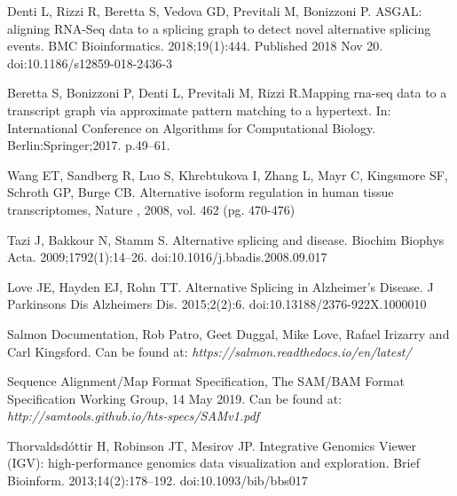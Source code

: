 \documentclass[a4paper,12pt]{article}
\begin{document}
   \newpage

    \tableofcontents
    \newpage
    
    \setlength{\parskip}{0.5em}

    	
    	
    	
    	
    	  
    	
    	
    	
    	
    	
    	
    	
    	
		
		
		\begin{thebibliography}{9}

			Denti L, Rizzi R, Beretta S, Vedova GD, Previtali M, Bonizzoni P. ASGAL: aligning RNA-Seq data to a splicing graph to detect novel alternative splicing events. BMC Bioinformatics. 2018;19(1):444. Published 2018 Nov 20. doi:10.1186/s12859-018-2436-3
			
 Beretta S, Bonizzoni P, Denti L, Previtali M, Rizzi R.Mapping rna-seq data to a transcript graph via approximate pattern matching to a hypertext. In: International Conference on Algorithms for Computational Biology. Berlin:Springer;2017. p.49–61. 
			
				Wang ET,  Sandberg R,  Luo S,  Khrebtukova I,  Zhang L,  Mayr C,  Kingsmore SF,  Schroth GP,  Burge CB. Alternative isoform regulation in human tissue transcriptomes, Nature , 2008, vol. 462 (pg. 470-476)
				
Tazi J, Bakkour N, Stamm S. Alternative splicing and disease. Biochim Biophys Acta. 2009;1792(1):14–26. doi:10.1016/j.bbadis.2008.09.017
							
			Love JE, Hayden EJ, Rohn TT. Alternative Splicing in Alzheimer's Disease. J Parkinsons Dis Alzheimers Dis. 2015;2(2):6. doi:10.13188/2376-922X.1000010
			
			Salmon Documentation, Rob Patro, Geet Duggal, Mike Love, Rafael Irizarry and Carl Kingsford. Can be found at: \textit{https://salmon.readthedocs.io/en/latest/}
			
			Sequence Alignment/Map Format Specification, The SAM/BAM Format Specification Working Group, 14 May 2019. Can be found at: \textit{http://samtools.github.io/hts-specs/SAMv1.pdf}
			
			Thorvaldsdóttir H, Robinson JT, Mesirov JP. Integrative Genomics Viewer (IGV): high-performance genomics data visualization and exploration. Brief Bioinform. 2013;14(2):178–192. doi:10.1093/bib/bbs017
			
		\end{thebibliography}
\end{document}
